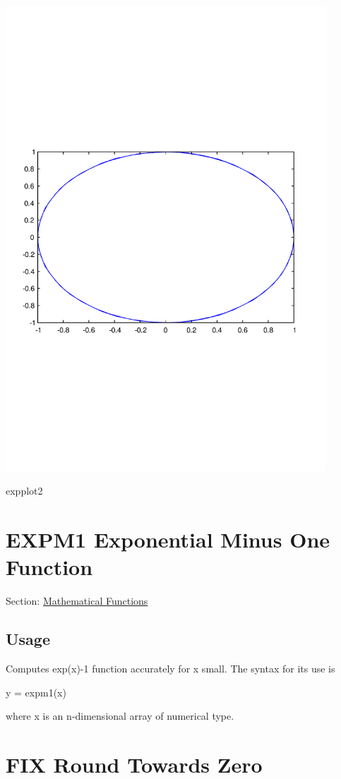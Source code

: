  
\begin{DoxyImage}
\includegraphics[width=12cm]{expplot2}
\caption{expplot2}
\end{DoxyImage}
 \hypertarget{mathfunctions_expm1}{}\section{E\-X\-P\-M1 Exponential Minus One Function}\label{mathfunctions_expm1}
Section\-: \hyperlink{sec_mathfunctions}{Mathematical Functions} \hypertarget{vtkwidgets_vtkxyplotwidget_Usage}{}\subsection{Usage}\label{vtkwidgets_vtkxyplotwidget_Usage}
Computes {\ttfamily exp(x)-\/1} function accurately for {\ttfamily x} small. The syntax for its use is \begin{DoxyVerb}   y = expm1(x)
\end{DoxyVerb}
 where {\ttfamily x} is an {\ttfamily n}-\/dimensional array of numerical type. \hypertarget{mathfunctions_fix}{}\section{F\-I\-X Round Towards Zero}\label{mathfunctions_fix}
